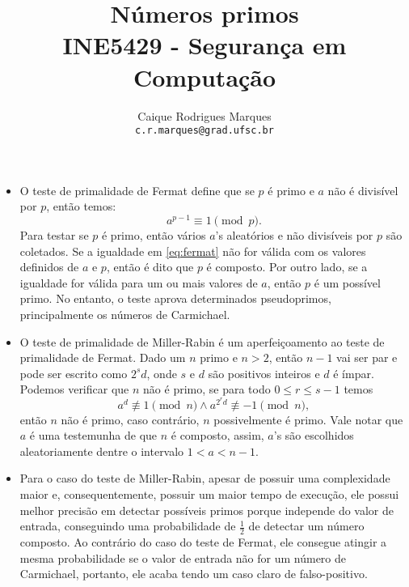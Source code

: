 \documentclass{article}
\title{\textbf{Números primos \\
        \large INE5429 - Segurança em Computação}}
\author{
    Caique Rodrigues Marques \\
    {\texttt{c.r.marques@grad.ufsc.br}}
}
\date{}
\begin{document}
\maketitle

\begin{itemize}
    \item O teste de primalidade de Fermat define que se $p$ é primo e $a$ não
    é divisível por $p$, então temos: 
    \begin{equation}\label{eq:fermat}
        a^{p-1} \equiv 1 \pmod{p}.
    \end{equation}
    Para testar se $p$ é primo, então vários $a$'s aleatórios e não divisíveis
    por $p$ são coletados. Se a igualdade em \ref{eq:fermat} não for válida com
    os valores definidos de $a$ e $p$, então é dito que $p$ é composto. Por
    outro lado, se a igualdade for válida para um ou mais valores de $a$, então
    $p$ é um possível primo. No entanto, o teste aprova determinados
    pseudoprimos\footnotemark[1], principalmente os números de
    Carmichael\footnotemark[2].

    
    \item O teste de primalidade de Miller-Rabin é um aperfeiçoamento ao teste
    de primalidade de Fermat. Dado um $n$ primo e $n > 2$, então $n-1$ vai ser
    par e pode ser escrito como $2^{s}d$, onde $s$ e $d$ são positivos inteiros
    e $d$ é ímpar. Podemos verificar que $n$ não é primo, se para todo $0 \leq
    r \leq s-1$ temos
    \begin{equation*}
        a^{d} \not\equiv 1 \pmod{n} \land a^{2^{r}d} \not\equiv -1 \pmod{n},
    \end{equation*}
    então $n$ não é primo, caso contrário, $n$ possivelmente é primo. Vale
    notar que $a$ é uma testemunha de que $n$ é composto, assim, $a$'s são
    escolhidos aleatoriamente dentre o intervalo $1 < a < n-1$.
    
    \item Para o caso do teste de Miller-Rabin, apesar de possuir uma
    complexidade maior e, consequentemente, possuir um maior tempo de execução,
    ele possui melhor precisão em detectar possíveis primos porque independe do
    valor de entrada, conseguindo uma probabilidade de $\frac{1}{2}$ de
    detectar um número composto. Ao contrário do caso do teste de Fermat, ele
    consegue atingir a mesma probabilidade se o valor de entrada não for um
    número de Carmichael, portanto, ele acaba tendo um caso claro de
    falso-positivo.


\end{itemize}
\end{document}
